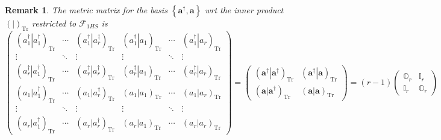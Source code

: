 \documentclass[aps, preprint]{revtex4}
\newtheorem{remark}[theorem]{Remark}
\begin{document}
\begin{remark}
The metric matrix for the basis $\left \{\mathbf{a}^{ \dag } ,\mathbf{a}\right \}$ wrt the inner product $\left (\left .\text{}\right \vert \right )_{\ensuremath{\operatorname*{Tr}}}$ restricted to $\mathcal{F}_{1 H S}$ is
\begin{equation}\left (\begin{array}{cccccc}\left (\left .a_{1}^{ \dag }\right \vert a_{1}^{ \dag }\right )_{\ensuremath{\operatorname*{Tr}}} & \cdots  & \left (\left .a_{1}^{ \dag }\right \vert a_{r}^{ \dag }\right )_{\ensuremath{\operatorname*{Tr}}} & \left (\left .a_{1}^{ \dag }\right \vert a_{1}\right )_{\ensuremath{\operatorname*{Tr}}} & \cdots  & \left (\left .a_{1}^{ \dag }\right \vert a_{r}\right )_{\ensuremath{\operatorname*{Tr}}} \\
\vdots  & \ddots  & \vdots  & \vdots  & \ddots  & \vdots  \\
\left (\left .a_{r}^{ \dag }\right \vert a_{1}^{ \dag }\right )_{\ensuremath{\operatorname*{Tr}}} & \cdots  & \left (\left .a_{r}^{ \dag }\right \vert a_{r}^{ \dag }\right )_{\ensuremath{\operatorname*{Tr}}} & \left (\left .a_{r}^{ \dag }\right \vert a_{1}\right )_{\ensuremath{\operatorname*{Tr}}} & \cdots  & \left (\left .a_{r}^{ \dag }\right \vert a_{r}\right )_{\ensuremath{\operatorname*{Tr}}} \\
\left (\left .a_{1}\right \vert a_{1}^{ \dag }\right )_{\ensuremath{\operatorname*{Tr}}} & \cdots  & \left (\left .a_{1}\right \vert a_{r}^{ \dag }\right )_{\ensuremath{\operatorname*{Tr}}} & \left (\left .a_{1}\right \vert a_{1}\right )_{\ensuremath{\operatorname*{Tr}}} & \cdots  & \left (\left .a_{1}\right \vert a_{r}\right )_{\ensuremath{\operatorname*{Tr}}} \\
\vdots  & \ddots  & \vdots  & \vdots  & \ddots  & \vdots  \\
\left (\left .a_{r}\right \vert a_{1}^{ \dag }\right )_{\ensuremath{\operatorname*{Tr}}} & \cdots  & \left (\left .a_{r}\right \vert a_{r}^{ \dag }\right )_{\ensuremath{\operatorname*{Tr}}} & \left (\left .a_{r}\right \vert a_{1}\right )_{\ensuremath{\operatorname*{Tr}}} & \cdots  & \left (\left .a_{r}\right \vert a_{r}\right )_{\ensuremath{\operatorname*{Tr}}}\end{array}\right ) =\left (\begin{array}{cc}\left (\left .\mathbf{a}^{ \dag }\right \vert \mathbf{a}^{ \dag }\right )_{\ensuremath{\operatorname*{Tr}}} & \left (\left .\mathbf{a}^{ \dag }\right \vert \mathbf{a}\right )_{\ensuremath{\operatorname*{Tr}}} \\
\left (\left .\mathbf{a}\right \vert \mathbf{a}^{ \dag }\right )_{\ensuremath{\operatorname*{Tr}}} & \left (\left .\mathbf{a}\right \vert \mathbf{a}\right )_{\ensuremath{\operatorname*{Tr}}}\end{array}\right ) =\left (r -1\right ) \left (\begin{array}{cc}\mathbb{O}_{r} & \mathbb{I}_{r} \\
\mathbb{I}_{r} & \mathbb{O}_{r}\end{array}\right )
\end{equation}
\end{remark}
\end{document}
